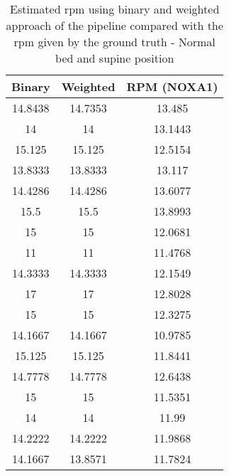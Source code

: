 \begin{table}[h]
    \centering
    \begin{tabular}{|c|c|c|}
    \hline 
     Binary  &  Weighted & RPM (NOXA1)  \\%

    \hline 
     14.8438  & 14.7353  & 13.485 \\ %
   14  & 14  & 13.1443 \\%
     15.125  & 15.125 & 12.5154 \\ %
    13.8333  & 13.8333 &13.117\\ %
  14.4286  & 14.4286 & 13.6077\\ %
    15.5  & 15.5 & 13.8993\\ %
     15 &  15 & 12.0681\\ %
  11 &  11 & 11.4768\\ %
 14.3333 &  14.3333 & 12.1549 \\ %
  17 &  17 & 12.8028 \\ %
 15 &  15 & 12.3275 \\ %
 14.1667 & 14.1667 & 10.9785 \\ %
  15.125 & 15.125 & 11.8441 \\ %
 14.7778 &  14.7778 & 12.6438\\ %
    15 &  15 & 11.5351 \\ %
    14 & 14 & 11.99 \\ %
    14.2222 & 14.2222 & 11.9868 \\ %
    14.1667 &  13.8571 & 11.7824 \\ %

    \hline 
    \end{tabular}
    \caption{Estimated rpm using binary and weighted approach of the pipeline compared with the rpm given by the ground truth - Normal bed and supine position}
    \label{tab:SupineNormalStill}
\end{table}





 
    